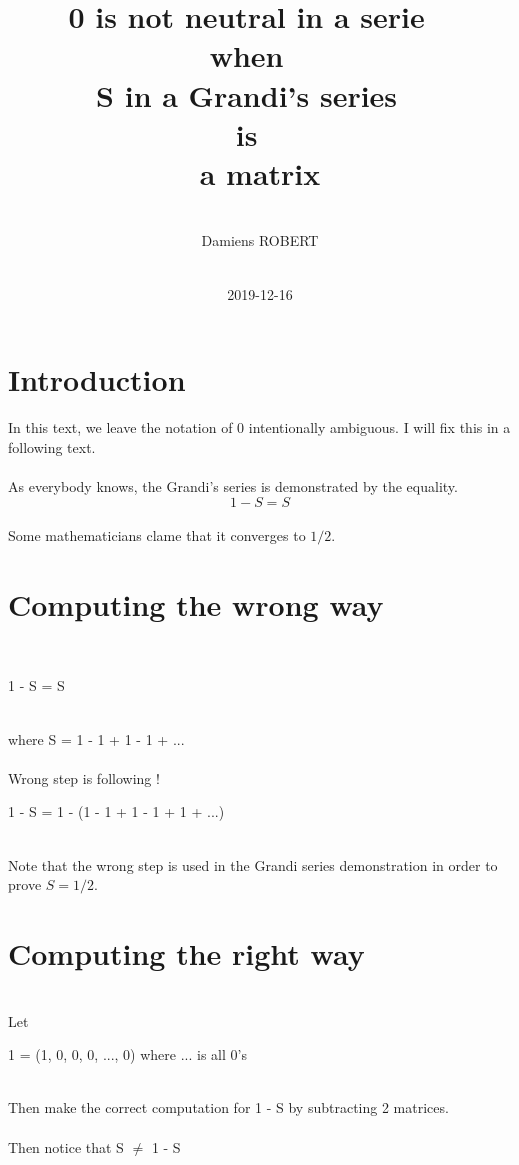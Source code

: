\documentclass{article}
\title{0 is not neutral in a serie
~\\
when
~\\
S in a Grandi's series
~\\
is
~\\
a matrix
}
\date{
~\\
2019-12-16
}
\author{
~\\
Damiens ROBERT
}
\begin{document}
  \maketitle
  \section{Introduction}
    In this text, we leave the notation of 0 intentionally ambiguous. I will fix this in a following text.
    \paragraph{}
      As everybody knows, the Grandi's series is demonstrated by the equality.
      \begin{equation*}
      1 - S = S
      \end{equation*}
      ~\\
      Some mathematicians clame that it converges to $1/2$.
      ~\\
  \section{Computing the wrong way}
    ~\\
    \centerline{
    1 - S = S
    }
    ~\\
    where S = 1 - 1 + 1 - 1 + ...
    ~\\
    ~\\
    Wrong step is following !
    ~\\
    \centerline{
    1 - S = 1 - (1 - 1 + 1 - 1 + 1 + ...)
    }
    ~\\
    Note that the wrong step is used in the Grandi series demonstration in order to prove $S=1/2$.
  \section{Computing the right way}
    ~\\
    Let
    ~\\
    \centerline{
    1 = (1, 0, 0, 0, ..., 0) where ... is all 0's
    }
    ~\\
    Then make the correct computation for 1 - S by subtracting 2 matrices.
    ~\\
    ~\\
    Then notice that S $\neq$ 1 - S
\end{document}
